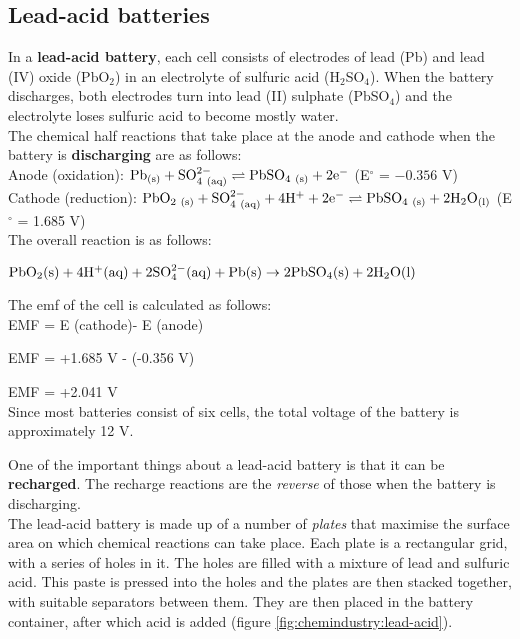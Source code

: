 \subsection{Lead-acid batteries}

In a \textbf{lead-acid battery}, each cell consists of electrodes of lead (Pb) and lead (IV) oxide (PbO$_{2}$) in an electrolyte of sulfuric acid (H$_{2}$SO$_{4}$). When the battery discharges, both electrodes turn into lead (II) sulphate (PbSO$_{4}$) and the electrolyte loses sulfuric acid to become mostly water.\\

The chemical half reactions that take place at the anode and cathode when the battery is \textbf{discharging} are as follows:\\

Anode (oxidation): $\rm{Pb_{(s)} + SO_{4\ (aq)}^{2-} \rightleftharpoons PbSO_{4\ (s)} + 2e^{-}}$ (E$^{\circ}$ = $-0.356$ V)\\



Cathode (reduction): $\rm{PbO_{2\ (s)} + SO_{4\ (aq)}^{2-} + 4H^{+} + 2e^{-} \rightleftharpoons PbSO_{4\ (s)}+ 2H_{2}O_{(l)}}$ (E$^{\circ}$ = 1.685 V)\\


The overall reaction is as follows:

\begin{center}
$\rm{PbO_{2}(s) + 4H^{+}(aq) + 2SO_{4}^{2-}(aq) + Pb(s) \rightarrow 2PbSO_{4}(s) + 2H_{2}O(l)}$
\end{center}

The emf of the cell is calculated as follows:\\


EMF = E (cathode)- E (anode)

EMF = +1.685 V - (-0.356 V)

EMF = +2.041 V\\

Since most batteries consist of six cells, the total voltage of the battery is approximately 12 V.

One of the important things about a lead-acid battery is that it can be \textbf{recharged}. The recharge reactions are the \textit{reverse} of those when the battery is discharging.\\

The lead-acid battery is made up of a number of \textit{plates} that maximise the surface area on which chemical reactions can take place. Each plate is a rectangular grid, with a series of holes in it. The holes are filled with a mixture of lead and sulfuric acid. This paste is pressed into the holes and the plates are then stacked together, with suitable separators between them. They are then placed in the battery container, after which acid is added (figure \ref{fig:chemindustry:lead-acid}).

